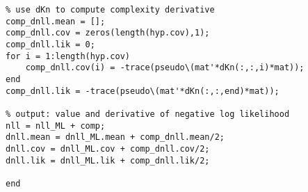 \begin{verbatim}
% use dKn to compute complexity derivative
comp_dnll.mean = [];
comp_dnll.cov = zeros(length(hyp.cov),1);
comp_dnll.lik = 0;
for i = 1:length(hyp.cov)
    comp_dnll.cov(i) = -trace(pseudo\(mat'*dKn(:,:,i)*mat));
end
comp_dnll.lik = -trace(pseudo\(mat'*dKn(:,:,end)*mat));

% output: value and derivative of negative log likelihood
nll = nll_ML + comp;
dnll.mean = dnll_ML.mean + comp_dnll.mean/2;
dnll.cov = dnll_ML.cov + comp_dnll.cov/2;
dnll.lik = dnll_ML.lik + comp_dnll.lik/2; 

end
\end{verbatim}